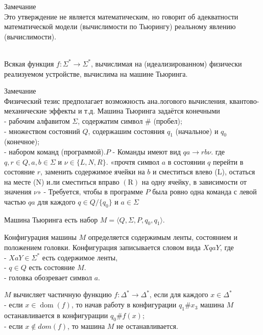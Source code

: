 Замечание\\
Это утверждение не является математическим, но говорит об адекватности математической модели (вычислимости по Тьюрингу) реальному явлению (вычислимости).\\
\\
\begin{theo}
Всякая функция $f: \Sigma^{*} \rightarrow \Sigma^{*}$, вычислимая на (идеализированном) физически реализуемом устройстве, вычислима на машине Тьюринга.
\end{theo}
Замечание\\
Физический тезис предполагает возможность ана.логового вычисления, квантово-механические эффекты и т.д.
\vskip 0.2in
Машина Тьюринга задаётся конечными\\
- рабочим алфавитом $\Sigma$, содержатим символ $\#$ (пробел);\\
- множеством состояний $Q$, содержашим состояния $q_{1}$ (начальное) и $q_{0}$ (конечное);\\
- набором команд (программой).$P$
\vskip 0.2in
- Команды имеют вид $q a \rightarrow r b \nu .$ где $q, r \in Q, a, b \in \Sigma$ и $\nu \in\{L, N, R\}$. «прочтя символ $a$ в состоянии $q$ перейти в состояние $r$, заменить содержимое ячейки на $b$ и сместиться влево (L), остаться на месте (N) и.ли сместиться вправо
$(\mathrm{R})$ на одну ячейку, в зависимости от значения $\nu »$
- Требуется, чтобы в программе $P$ была ровно одна команда с левой частью $qa$ для каждого $q \in Q \slash \{q_0\}$ и $a \in \Sigma$

\begin{defn}
Машина Тьюринга есть набор $M = \langle Q, \Sigma, P ,q_0, q_1 \rangle$.
\end{defn}

\begin{defn}
Конфигураџия машины $M$ определяется содержимым ленты, состоянием и положением головки. Конфигурация записывается словом вида $X q a Y$, где\\
- $X a Y \in \Sigma^{*}$ есть содержимое ленты,\\
- $q \in Q$ есть состояние $M$.\\
- головка обозревает символ $a .$
\end{defn}

\begin{defn}
$M$ вычисляет частичную функцию $f: \Delta^{*} \rightarrow \Delta^{*}$, если для каждого $x \in \Delta^{*}$\\
- если $x \in \operatorname{dom}(f)$, то начав работу в конфигурации $q_{1} \# x_{3}$ машина $M$ останавливается в конфигуращии $q_{0} \# f(x) ;$\\
- если $x \notin d o m(f)$, то машина $M$ не останавливается.
\end{defn}